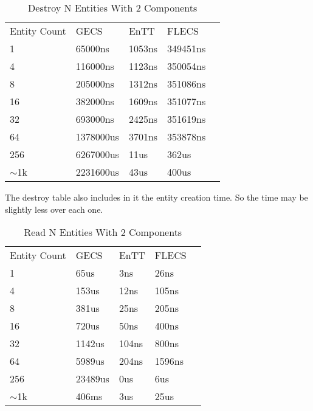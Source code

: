 \begin{table}[H]
    \centering
    \begin{tabular}{lllll}
        Entity Count & GECS      & EnTT   & FLECS    &  \\
        1            & 65000ns   & 1053ns & 349451ns &  \\
        4            & 116000ns  & 1123ns & 350054ns &  \\
        8            & 205000ns  & 1312ns & 351086ns &  \\
        16           & 382000ns  & 1609ns & 351077ns &  \\
        32           & 693000ns & 2425ns & 351619ns &  \\
        64           & 1378000us   & 3701ns & 353878ns &  \\
        256          & 6267000us  & 11us   & 362us    &  \\
        $\sim$1k     & 2231600us & 43us  & 400us    & 
    \end{tabular}
    \caption{Destroy N Entities With 2 Components}    
\end{table}

The destroy table also includes in it the entity creation time. So the time may be slightly less over each one.

\begin{table}[H]
    \centering
    \begin{tabular}{lllll}
    Entity Count & GECS      & EnTT   & FLECS    &  \\
    1            & 65us   & 3ns & 26ns &  \\
    4            & 153us  & 12ns & 105ns &  \\
    8            & 381us  & 25ns & 205ns &  \\
    16           & 720us  & 50ns & 400ns &  \\
    32           & 1142us & 104ns & 800ns &  \\
    64           & 5989us   & 204ns & 1596ns &  \\
    256          & 23489us  & 0us   & 6us   &  \\
    $\sim$1k     & 406ms & 3us  & 25us  & 
    \end{tabular}
    \caption{Read N Entities With 2 Components}    
\end{table}
